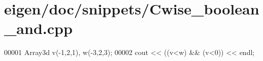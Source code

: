 \hypertarget{eigen_2doc_2snippets_2_cwise__boolean__and_8cpp_source}{}\section{eigen/doc/snippets/\+Cwise\+\_\+boolean\+\_\+and.cpp}
\label{eigen_2doc_2snippets_2_cwise__boolean__and_8cpp_source}

\begin{DoxyCode}
00001 Array3d v(-1,2,1), w(-3,2,3);
00002 cout << ((v<w) && (v<0)) << endl;
\end{DoxyCode}
